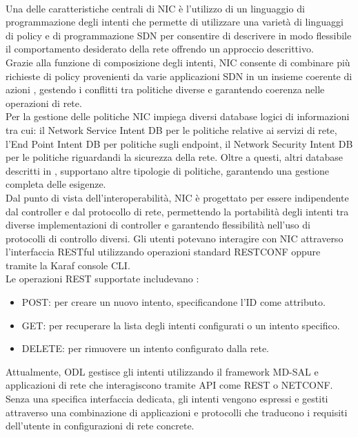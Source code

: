 \\Una delle caratteristiche centrali di NIC è l'utilizzo di un linguaggio di programmazione degli intenti che permette di utilizzare una varietà di linguaggi di policy e di programmazione SDN
per consentire di descrivere in modo flessibile il comportamento desiderato della rete offrendo un approccio descrittivo.
\\Grazie alla funzione di composizione degli intenti, NIC consente di combinare più richieste di policy provenienti da varie applicazioni SDN in un insieme coerente di azioni
, gestendo i conflitti tra politiche diverse e garantendo coerenza nelle operazioni di rete.
\\Per la gestione delle politiche NIC impiega diversi database logici di informazioni tra cui: il Network Service Intent DB per le politiche relative ai servizi di rete,
l'End Point Intent DB per politiche sugli endpoint, il Network Security Intent DB per le politiche riguardandi la sicurezza della rete.
Oltre a questi, altri database descritti in \cite{NICProposal}, supportano altre tipologie di politiche, garantendo una gestione completa delle esigenze.
\\Dal punto di vista dell'interoperabilità, NIC è progettato per essere indipendente dal controller e dal protocollo di rete, 
permettendo la portabilità degli intenti tra diverse implementazioni di controller e garantendo flessibilità nell'uso di protocolli di controllo diversi.
Gli utenti potevano interagire con NIC attraverso l'interfaccia RESTful utilizzando operazioni standard RESTCONF oppure tramite la Karaf console CLI.
\\Le operazioni REST supportate includevano \cite{nic}:
\begin{itemize}
    \item POST: per creare un nuovo intento, specificandone l'ID come attributo.
    \item GET: per recuperare la lista degli intenti configurati o un intento specifico.
    \item DELETE: per rimuovere un intento configurato dalla rete.
\end{itemize}
Attualmente, ODL gestisce gli intenti utilizzando il framework MD-SAL e applicazioni di rete che interagiscono tramite API come REST o NETCONF.
Senza una specifica interfaccia dedicata, gli intenti vengono espressi e gestiti attraverso una combinazione di applicazioni e protocolli che traducono i requisiti dell'utente in configurazioni di rete concrete.
